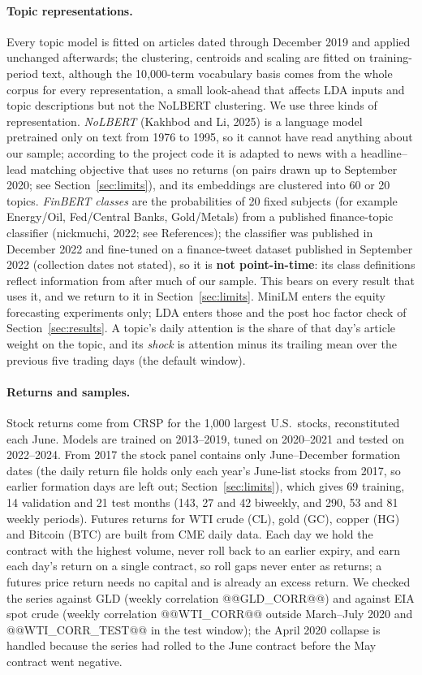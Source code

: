 \documentclass[11pt]{article}
\begin{document}
\paragraph{Topic representations.} Every topic model is fitted on articles dated through December 2019 and applied unchanged afterwards; the clustering, centroids and scaling are fitted on training-period text, although the 10{,}000-term vocabulary basis comes from the whole corpus for every representation, a small look-ahead that affects LDA inputs and topic descriptions but not the NoLBERT clustering. We use three kinds of representation. \emph{NoLBERT} (Kakhbod and Li, 2025) is a language model pretrained only on text from 1976 to 1995, so it cannot have read anything about our sample; according to the project code it is adapted to news with a headline--lead matching objective that uses no returns (on pairs drawn up to September 2020; see Section~\ref{sec:limits}), and its embeddings are clustered into 60 or 20 topics. \emph{FinBERT classes} are the probabilities of 20 fixed subjects (for example Energy/Oil, Fed/Central Banks, Gold/Metals) from a published finance-topic classifier (nickmuchi, 2022; see References); the classifier was published in December 2022 and fine-tuned on a finance-tweet dataset published in September 2022 (collection dates not stated), so it is \textbf{not point-in-time}: its class definitions reflect information from after much of our sample. This bears on every result that uses it, and we return to it in Section~\ref{sec:limits}. MiniLM enters the equity forecasting experiments only; LDA enters those and the post hoc factor check of Section~\ref{sec:results}. A topic's daily attention is the share of that day's article weight on the topic, and its \emph{shock} is attention minus its trailing mean over the previous five trading days (the default window).

\paragraph{Returns and samples.} Stock returns come from CRSP for the 1{,}000 largest U.S.\ stocks, reconstituted each June. Models are trained on 2013--2019, tuned on 2020--2021 and tested on 2022--2024. From 2017 the stock panel contains only June--December formation dates (the daily return file holds only each year's June-list stocks from 2017, so earlier formation days are left out; Section~\ref{sec:limits}), which gives 69 training, 14 validation and 21 test months (143, 27 and 42 biweekly, and 290, 53 and 81 weekly periods). Futures returns for WTI crude (CL), gold (GC), copper (HG) and Bitcoin (BTC) are built from CME daily data. Each day we hold the contract with the highest volume, never roll back to an earlier expiry, and earn each day's return on a single contract, so roll gaps never enter as returns; a futures price return needs no capital and is already an excess return. We checked the series against GLD (weekly correlation @@GLD_CORR@@) and against EIA spot crude (weekly correlation @@WTI_CORR@@ outside March--July 2020 and @@WTI_CORR_TEST@@ in the test window); the April 2020 collapse is handled because the series had rolled to the June contract before the May contract went negative.
\end{document}
